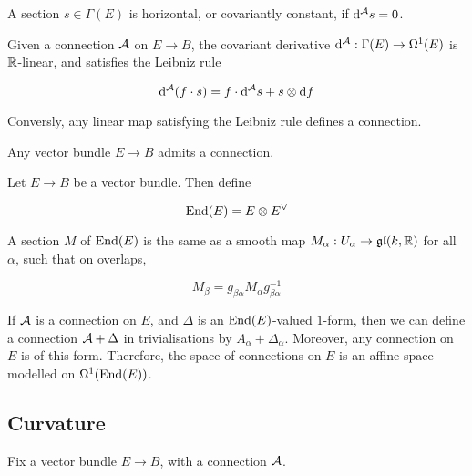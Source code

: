 \begin{definition}

    A section \(s \in \Gamma(E)\) is horizontal, or covariantly constant, if \(\dd^{\mathcal{A}} s = 0\).
\end{definition}

\begin{lemma}
    Given a connection \(\mathcal{A}\) on \(E \to B\), the covariant derivative \(\dd^{\mathcal{A}} : \Gamma(E) \to \Omega^1(E)\) is \(\mathbb{R}\)-linear, and satisfies the Leibniz rule

    \[\dd^{\mathcal{A}}(f \cdot s) = f \cdot \dd^{\mathcal{A}} s + s \otimes \dd f\]

    Conversly, any linear map satisfying the Leibniz rule defines a connection.
\end{lemma}

\begin{lemma}
    Any vector bundle \(E \to B\) admits a connection.
\end{lemma}

\begin{definition}
    [\(\End(E)\)] Let \(E \to B\) be a vector bundle. Then define

    \[\operatorname{End}(E) = E \otimes E^\vee\]
\end{definition}

\begin{proposition}
    A section \(M\) of \(\End(E)\) is the same as a smooth map \(M_\alpha : U_\alpha \to \mathfrak{g}\mathfrak{l}(k, \mathbb{R})\) for all \(\alpha\), such that on overlaps,

    \[M_\beta = g_{\beta\alpha}M_\alpha g_{\beta\alpha}^{-1}\]
\end{proposition}

\begin{proposition}
    If \(\mathcal{A}\) is a connection on \(E\), and \(\Delta\) is an \(\End(E)\)-valued \(1\)-form, then we can define a connection \(\mathcal{A} + \Delta\) in trivialisations by \(A_\alpha + \Delta_\alpha\). Moreover, any connection on \(E\) is of this form. Therefore, the space of connections on \(E\) is an affine space modelled on \(\Omega^1(\operatorname{End}(E))\).
\end{proposition}

\subsection{Curvature}

Fix a vector bundle \(E \to B\), with a connection \(\mathcal{A}\).

